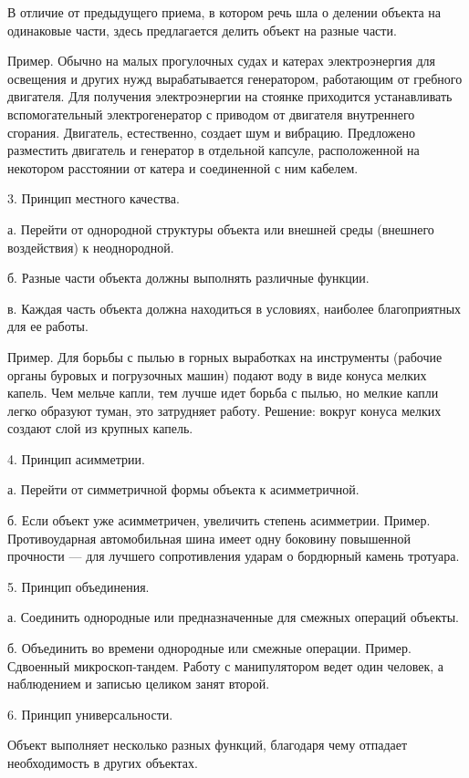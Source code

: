В отличие от предыдущего приема, в  котором речь шла о делении объекта
на одинаковые части, здесь предлагается делить объект на разные части.

Пример. Обычно на малых прогулочных судах и катерах электроэнергия для
освещения  и других  нужд  вырабатывается  генератором, работающим  от
гребного двигателя. Для получения электроэнергии на стоянке приходится
устанавливать вспомогательный электрогенератор с приводом от двигателя
внутреннего сгорания. Двигатель, естественно,  создает шум и вибрацию.
Предложено  разместить  двигатель  и генератор  в  отдельной  капсуле,
расположенной на  некотором расстоянии от  катера и соединенной  с ним
кабелем.

3. Принцип местного качества.

а. Перейти от однородной структуры объекта или внешней среды (внешнего
воздействия) к неоднородной.

б. Разные части объекта должны выполнять различные функции.

в.  Каждая  часть  объекта  должна  находиться  в  условиях,  наиболее
благоприятных для ее работы.

Пример. Для борьбы с пылью в горных выработках на инструменты (рабочие
органы буровых и  погрузочных машин) подают воду в  виде конуса мелких
капель. Чем  мельче капли, тем  лучше идет  борьба с пылью,  но мелкие
капли  легко образуют  туман, это  затрудняет работу.  Решение: вокруг
конуса мелких создают слой из крупных капель.

4. Принцип асимметрии.

а. Перейти от симметричной формы объекта к асимметричной.

б. Если объект уже асимметричен, увеличить степень асимметрии. Пример.
Противоударная  автомобильная  шина  имеет  одну  боковину  повышенной
прочности  —  для  лучшего  сопротивления ударам  о  бордюрный  камень
тротуара.

5. Принцип объединения.

а.  Соединить  однородные  или предназначенные  для  смежных  операций
объекты.

б.  Объединить во  времени  однородные или  смежные операции.  Пример.
Сдвоенный микроскоп-тандем. Работу с манипулятором ведет один человек,
а наблюдением и записью целиком занят второй.

6. Принцип универсальности.

Объект  выполняет несколько  разных функций,  благодаря чему  отпадает
необходимость в других объектах.

